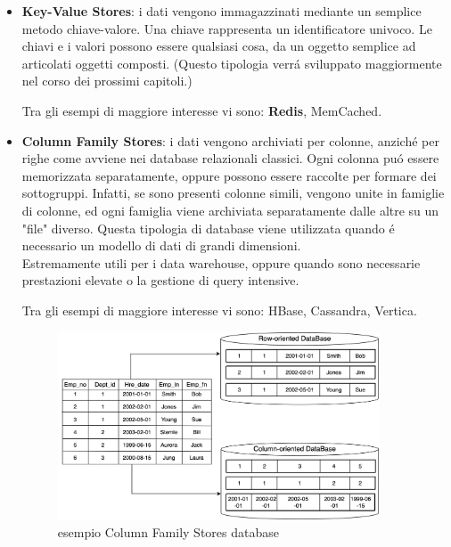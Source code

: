 \begin{itemize}
    \item \textbf{Key-Value Stores}: i dati vengono immagazzinati mediante un semplice metodo chiave-valore. Una chiave rappresenta un identificatore
    univoco. Le chiavi e i valori possono essere qualsiasi cosa, da un oggetto semplice ad articolati oggetti composti.
    (Questo tipologia verrá sviluppato maggiormente nel corso dei prossimi capitoli.)

    Tra gli esempi di maggiore interesse vi sono: \textbf{Redis}, MemCached.
    \item \textbf{Column Family Stores}: i dati vengono archiviati per colonne, anziché per righe come avviene nei database relazionali classici.
    Ogni colonna puó essere memorizzata separatamente, oppure possono essere raccolte per formare dei sottogruppi.
    Infatti, se sono presenti colonne simili, vengono unite in famiglie di colonne, ed ogni famiglia
    viene archiviata separatamente dalle altre su un "file" diverso.
    Questa tipologia di database viene utilizzata quando é necessario un modello di dati di grandi dimensioni.\\
    Estremamente utili per i data warehouse, oppure quando sono necessarie prestazioni elevate o la gestione di query intensive.

    Tra gli esempi di maggiore interesse vi sono: HBase, Cassandra, Vertica.

    \begin{figure}[H]
        \begin{center}
            \includegraphics[width=0.9\textwidth]{img/dbColumnOriented}
        \end{center}
    \caption{esempio Column Family Stores database}
    \end{figure}


\end{itemize}
